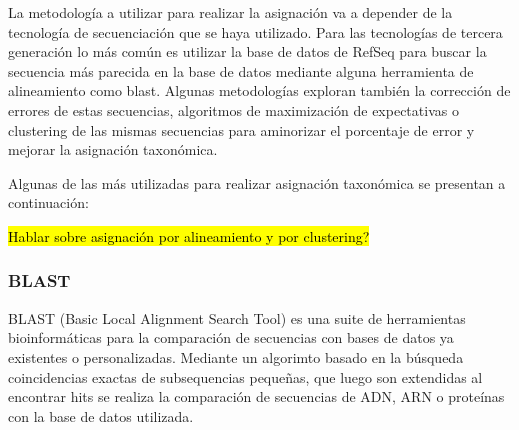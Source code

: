 La metodología a utilizar para realizar la asignación va a depender de la tecnología de secuenciación que se haya utilizado. %
Para las tecnologías de tercera generación lo más común es utilizar la base de datos de RefSeq para buscar la secuencia más parecida en la base de datos mediante alguna herramienta de alineamiento como blast.
Algunas metodologías exploran también la corrección de errores de estas secuencias, algoritmos de maximización de expectativas o clustering de las mismas secuencias para aminorizar el porcentaje de error y mejorar la asignación taxonómica. 

Algunas de las más utilizadas para realizar asignación taxonómica se presentan a continuación:

\hl{Hablar sobre asignación por alineamiento y por clustering?}
\subsubsection{BLAST}
BLAST (Basic Local Alignment Search Tool)  es una suite de herramientas bioinformáticas para la comparación de secuencias con bases de datos ya existentes o personalizadas.
Mediante un algorimto basado en la búsqueda coincidencias exactas de subsequencias pequeñas, que luego son extendidas al encontrar hits se realiza la comparación de secuencias de ADN, ARN o proteínas con la base de datos utilizada.

